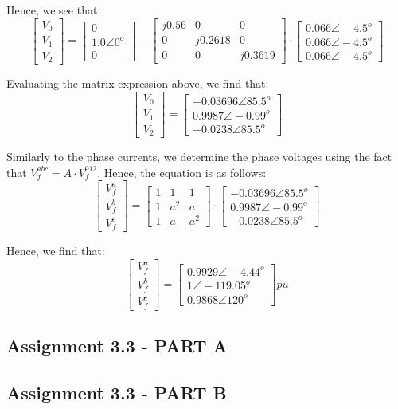 \documentclass{article}
\begin{document}
Hence, we see that:
\[
\begin{bmatrix}
V_0\\V_1\\V_2
\end{bmatrix}
=
\begin{bmatrix}
0\\1.0\angle0^o\\0
\end{bmatrix}
-
\begin{bmatrix}
j0.56 & 0 & 0\\
0 & j0.2618 & 0\\
0 & 0 & j0.3619
\end{bmatrix}
\cdot
\begin{bmatrix}
0.066 \angle -4.5^o\\0.066 \angle -4.5^o\\0.066 \angle -4.5^o
\end{bmatrix}
\]

Evaluating the matrix expression above, we find that:
\[
\begin{bmatrix}
V_0\\V_1\\V_2
\end{bmatrix}
=
\begin{bmatrix}
-0.03696 \angle 85.5^o\\0.9987 \angle -0.99^o\\-0.0238 \angle 85.5^o
\end{bmatrix}
\]

Similarly to the phase currents, we determine the phase voltages using the fact that $V^{abc}_f = A \cdot V^{012}_f$. Hence, the equation is as follows:
\[
\begin{bmatrix}
V^a_f\\V^b_f\\V^c_f
\end{bmatrix}
=
\begin{bmatrix}
1 & 1 & 1\\
1 & a^2 & a\\
1 & a & a^2
\end{bmatrix}
\cdot
\begin{bmatrix}
-0.03696 \angle 85.5^o\\0.9987 \angle -0.99^o\\-0.0238 \angle 85.5^o
\end{bmatrix}
\]

Hence, we find that:
\[
\begin{bmatrix}
V^a_f\\V^b_f\\V^c_f
\end{bmatrix}
=
\begin{bmatrix}
0.9929 \angle -4.44^o\\1 \angle -119.05^o\\0.9868 \angle 120^o
\end{bmatrix}
\si{pu}
\]

\subsection{Assignment 3.3 - PART A}

\subsection{Assignment 3.3 - PART B}
\end{document}
